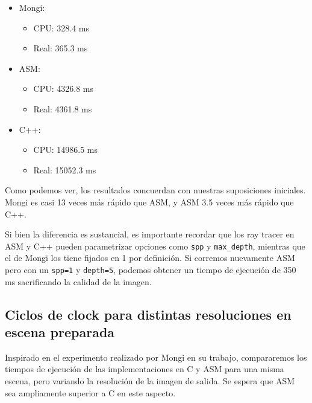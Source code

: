 \begin{itemize}
    \item Mongi:
        \begin{itemize}
            \item CPU: 328.4 ms
            \item Real: 365.3 ms
        \end{itemize}
    \item ASM:
        \begin{itemize}
            \item CPU: 4326.8 ms
            \item Real: 4361.8 ms
        \end{itemize}
    \item C++:
        \begin{itemize}
            \item CPU: 14986.5 ms
            \item Real: 15052.3 ms
        \end{itemize}
\end{itemize}

Como podemos ver, los resultados concuerdan con nuestras suposiciones iniciales.
Mongi es casi 13 veces más rápido que ASM, y ASM 3.5 veces más rápido que C++.

Si bien la diferencia es sustancial, es importante recordar que los ray tracer
en ASM y C++ pueden parametrizar opciones como \texttt{spp} y
\texttt{max\_depth}, mientras que el de Mongi los tiene fijados en 1 por
definición. Si corremos nuevamente ASM pero con un \texttt{spp=1} y
\texttt{depth=5}, podemos obtener un tiempo de ejecución de 350 ms sacrificando
la calidad de la imagen.


\subsection{Ciclos de clock para distintas resoluciones en escena preparada}

Inspirado en el experimento realizado por Mongi en su trabajo, compararemos los
tiempos de ejecución de las implementaciones en C y ASM para una misma escena,
pero variando la resolución de la imagen de salida. Se espera que ASM sea
ampliamente superior a C en este aspecto.

